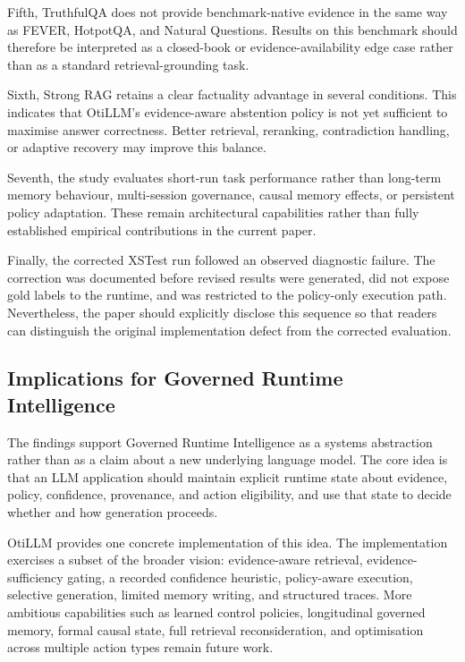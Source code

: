 \documentclass[manuscript, screen, review]{jair}
\begin{document}
Fifth, TruthfulQA does not provide benchmark-native evidence in the same way as FEVER, HotpotQA, and Natural Questions. Results on this benchmark should therefore be interpreted as a closed-book or evidence-availability edge case rather than as a standard retrieval-grounding task.

Sixth, Strong RAG retains a clear factuality advantage in several conditions. This indicates that OtiLLM's evidence-aware abstention policy is not yet sufficient to maximise answer correctness. Better retrieval, reranking, contradiction handling, or adaptive recovery may improve this balance.

Seventh, the study evaluates short-run task performance rather than long-term memory behaviour, multi-session governance, causal memory effects, or persistent policy adaptation. These remain architectural capabilities rather than fully established empirical contributions in the current paper.

Finally, the corrected XSTest run followed an observed diagnostic failure. The correction was documented before revised results were generated, did not expose gold labels to the runtime, and was restricted to the policy-only execution path. Nevertheless, the paper should explicitly disclose this sequence so that readers can distinguish the original implementation defect from the corrected evaluation.

\subsection{Implications for Governed Runtime Intelligence}

The findings support Governed Runtime Intelligence as a systems abstraction rather than as a claim about a new underlying language model. The core idea is that an LLM application should maintain explicit runtime state about evidence, policy, confidence, provenance, and action eligibility, and use that state to decide whether and how generation proceeds.

OtiLLM provides one concrete implementation of this idea. The implementation exercises a subset of the broader vision: evidence-aware retrieval, evidence-sufficiency gating, a recorded confidence heuristic, policy-aware execution, selective generation, limited memory writing, and structured traces. More ambitious capabilities such as learned control policies, longitudinal governed memory, formal causal state, full retrieval reconsideration, and optimisation across multiple action types remain future work.
\end{document}
